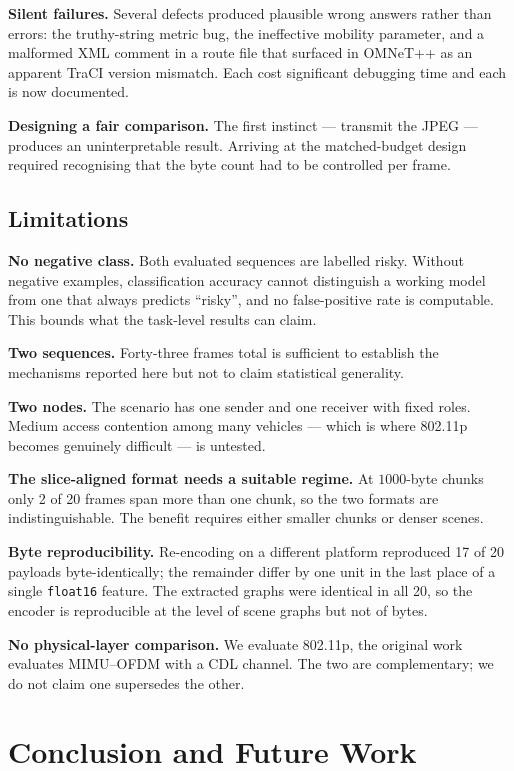 \documentclass{iutbscthesis}
\begin{document}
\textbf{Silent failures.} Several defects produced plausible wrong answers
rather than errors: the truthy-string metric bug, the ineffective mobility
parameter, and a malformed XML comment in a route file that surfaced in
OMNeT++ as an apparent TraCI version mismatch. Each cost significant debugging
time and each is now documented.

\textbf{Designing a fair comparison.} The first instinct --- transmit the JPEG
--- produces an uninterpretable result. Arriving at the matched-budget design
required recognising that the byte count had to be controlled per frame.

\section{Limitations}

\textbf{No negative class.} Both evaluated sequences are labelled risky. Without
negative examples, classification accuracy cannot distinguish a working model
from one that always predicts ``risky'', and no false-positive rate is
computable. This bounds what the task-level results can claim.

\textbf{Two sequences.} Forty-three frames total is sufficient to establish the
mechanisms reported here but not to claim statistical generality.

\textbf{Two nodes.} The scenario has one sender and one receiver with fixed
roles. Medium access contention among many vehicles --- which is where 802.11p
becomes genuinely difficult --- is untested.

\textbf{The slice-aligned format needs a suitable regime.} At $1000$-byte
chunks only 2 of 20 frames span more than one chunk, so the two formats are
indistinguishable. The benefit requires either smaller chunks or denser scenes.

\textbf{Byte reproducibility.} Re-encoding on a different platform reproduced
17 of 20 payloads byte-identically; the remainder differ by one unit in the last
place of a single \texttt{float16} feature. The extracted graphs were identical
in all 20, so the encoder is reproducible at the level of scene graphs but not
of bytes.

\textbf{No physical-layer comparison.} We evaluate 802.11p, the original work
evaluates MIMU--OFDM with a CDL channel. The two are complementary; we do not
claim one supersedes the other.

\chapter{Conclusion and Future Work} \label{chapter:conclusion}
\end{document}
